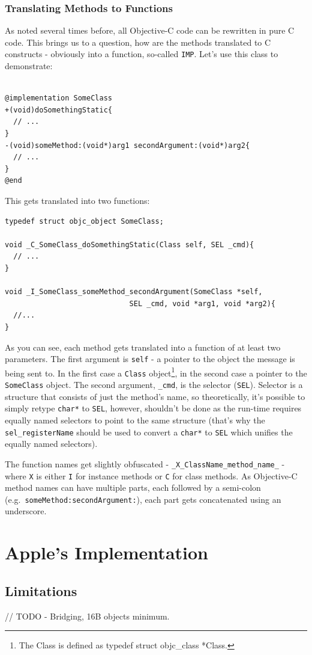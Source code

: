 \documentclass[a4paper, 11pt, fleqn]{book}
\begin{document}
\subsection{Translating Methods to Functions}

As noted several times before, all Objective-C code can be rewritten in pure C code. This brings us to a question, how are the methods translated to C constructs - obviously into a function, so-called \verb=IMP=. Let's use this class to demonstrate:

\begin{verbatim}

@implementation SomeClass
+(void)doSomethingStatic{
  // ...
}
-(void)someMethod:(void*)arg1 secondArgument:(void*)arg2{
  // ...
}
@end

\end{verbatim}

This gets translated into two functions:

\begin{verbatim}
typedef struct objc_object SomeClass;

void _C_SomeClass_doSomethingStatic(Class self, SEL _cmd){
  // ...
}

void _I_SomeClass_someMethod_secondArgument(SomeClass *self,
                             SEL _cmd, void *arg1, void *arg2){
  //...
}
\end{verbatim}

As you can see, each method gets translated into a function of at least two parameters. The first argument is \verb=self= - a pointer to the object the message is being sent to. In the first case a \verb=Class= object\footnote{The Class is defined as typedef struct objc\_class *Class.}, in the second case a pointer to the \verb=SomeClass= object. The second argument, \verb=_cmd=, is the selector (\verb=SEL=). Selector is a structure that consists of just the method's name, so theoretically, it's possible to simply retype \verb=char*= to \verb=SEL=, however, shouldn't be done as the run-time requires equally named selectors to point to the same structure (that's why the \verb=sel_registerName= should be used to convert a \verb=char*= to \verb=SEL= which unifies the equally named selectors).

The function names get slightly obfuscated - \verb=_X_ClassName_method_name_= - where \verb=X= is either \verb=I= for instance methods or \verb=C= for class methods. As Objective-C method names can have multiple parts, each followed by a semi-colon (e.g.\ \verb=someMethod:secondArgument:=), each part gets concatenated using an underscore.

\chapter{Apple's Implementation}
\section{Limitations}
// TODO
- Bridging, 16B objects minimum.
\end{document}
